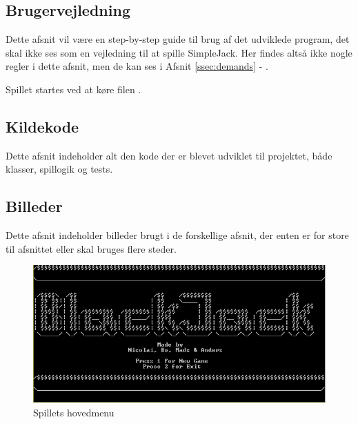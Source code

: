 \documentclass[a4paper]{article}
\begin{document}
      \subsection{Brugervejledning} \label{ssec:manual}
        Dette afsnit vil være en step-by-step guide til brug af det udviklede program,
        det skal ikke ses som en vejledning til at spille SimpleJack. Her findes altså ikke nogle regler
        i dette afsnit, men de kan ses i Afsnit \ref{ssec:demands} - .

        Spillet startes ved at køre filen .

      \subsection{Kildekode} \label{ssec:sourceCode}
        Dette afsnit indeholder alt den kode der er blevet udviklet til projektet,
        både klasser, spillogik og tests.

        
        
        

      \subsection{Billeder}
        Dette afsnit indeholder billeder brugt i de forskellige afsnit,
        der enten er for store til afsnittet eller skal bruges flere steder.

        \begin{figure}[H]
          \includegraphics{figures/MainMenu.PNG}

          \caption{Spillets hovedmenu}
          \label{fig:mainMenu}
        \end{figure}
\end{document}
